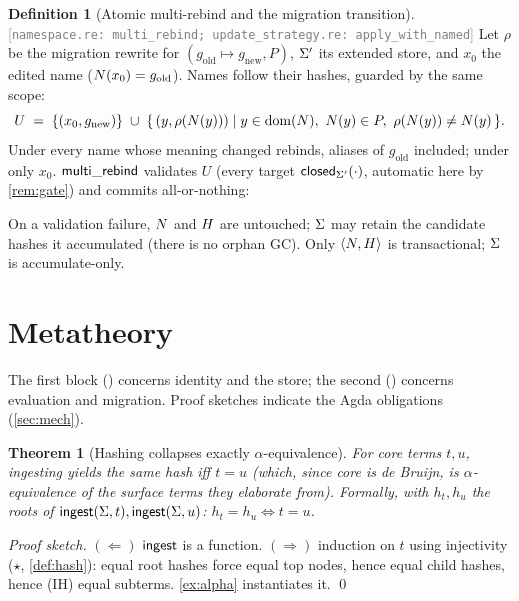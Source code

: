 \documentclass[11pt]{article}
\theoremstyle{definition}
\newtheorem{definition}{Definition}[section]
\theoremstyle{plain}
\newtheorem{theorem}{Theorem}[section]
\theoremstyle{remark}
\newcommand{\src}[1]{{\footnotesize\textcolor{gray}{[\texttt{#1}]}}}
\begin{document}
\begin{definition}[Atomic multi-rebind and the migration transition]\label{def:migrate}
\src{namespace.re: multi\_rebind; update\_strategy.re: apply\_with\_named} Let $\rho$ be the
migration rewrite for $(g_{\mathrm{old}} \mapsto g_{\mathrm{new}}, P)$, $\Sigma'$ its extended
store, and $x_0$ the edited name ($N(x_0) = g_{\mathrm{old}}$). Names follow their
hashes, guarded by the same scope:
\[
  U \;=\; \{(x_0, g_{\mathrm{new}})\} \;\cup\;
  \{\,(y, \rho(N(y))) \mid y \in \operatorname{dom}(N),\ N(y) \in P,\
     \rho(N(y)) \neq N(y)\,\}.
\]
Under \Follow{} every name whose meaning changed rebinds, aliases of $g_{\mathrm{old}}$
included; under \Pin{} only $x_0$. $\mathsf{multi\_rebind}$ validates $U$ (every target
$\mathsf{closed}_{\Sigma'}(\cdot)$, automatic here by \cref{rem:gate}) and commits all-or-nothing:
\begin{mathpar}
    {\Config{\Store}{\Names}{\Cache}{\Hist} \steps
     }
\end{mathpar}
On a validation failure, $N$ and $H$ are untouched; $\Sigma$ may retain the candidate
hashes it accumulated (there is no orphan GC). Only $\langle N,H\rangle$ is
transactional; $\Sigma$ is accumulate-only.
\end{definition}

\section{Metatheory}\label{sec:meta}

The first block () concerns identity and the store; the second
(\crefrange{thm:stability}{thm:migosc}) concerns evaluation and migration. Proof sketches
indicate the Agda obligations (\cref{sec:mech}).

\begin{theorem}[Hashing collapses exactly $\alpha$-equivalence]\label{thm:alpha}
For core terms $t,u$, ingesting yields the same hash iff $t = u$ (which, since core is de Bruijn,
is $\alpha$-equivalence of the surface terms they elaborate from). Formally, with $h_t,h_u$ the
roots of $\mathsf{ingest}(\Sigma,t),\mathsf{ingest}(\Sigma,u)$: $h_t = h_u \iff t = u$.
\end{theorem}
\begin{proof}[Proof sketch]
$(\Leftarrow)$ $\mathsf{ingest}$ is a function. $(\Rightarrow)$ induction on $t$ using injectivity
($\star$, \cref{def:hash}): equal root hashes force equal top nodes, hence equal child hashes,
hence (IH) equal subterms. \cref{ex:alpha} instantiates it. \qed
\end{proof}
\end{document}
